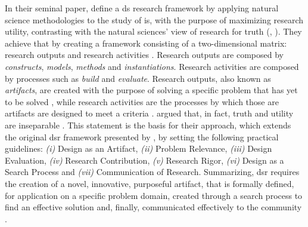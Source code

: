 In their seminal paper, \citeauthor{march_design_1995} \cite{march_design_1995} define a \gls{ds} research framework by applying natural science methodologies to the study of \gls{is}, with the purpose of maximizing research utility, contrasting with the natural sciences' view of research for truth (\cite[80]{hevner_design_2004}, \cite[253]{march_design_1995}). They achieve that by creating a framework consisting of a two-dimensional matrix: research outputs and research activities \cite[255]{march_design_1995}. Research outputs are composed by \textit{constructs}, \textit{models}, \textit{methods} and \textit{instantiations}. Research activities are composed by processes such as \textit{build} and \textit{evaluate}. Research outputs, also known as \textit{artifacts}, are created with the purpose of solving a specific problem that has yet to be solved \cite[78]{hevner_design_2004}, while research activities are the processes by which those are artifacts are designed to meet a criteria \cite[79--80]{hevner_design_2004}. \citeauthor{hevner_design_2004} \cite{hevner_design_2004} argued that, in fact, truth and utility are inseparable \cite[80]{hevner_design_2004}. This statement is the basis for their approach, which extends the original \gls{dsr} framework \cite{march_design_1995} presented by \citeauthor{march_design_1995} \cite{march_design_1995}, by setting the following practical guidelines: \emph{(i)} Design as an Artifact, \emph{(ii)} Problem Relevance, \emph{(iii)} Design Evaluation, \emph{(iv)} Research Contribution, \emph{(v)} Research Rigor, \emph{(vi)} Design as a Search Process and \emph{(vii)} Communication of Research. Summarizing, \gls{dsr} requires the creation of a novel, innovative, purposeful artifact, that is formally defined, for application on a specific problem domain, created through a search process to find an effective solution and, finally, communicated effectively to the community \cite[82]{hevner_design_2004}.

